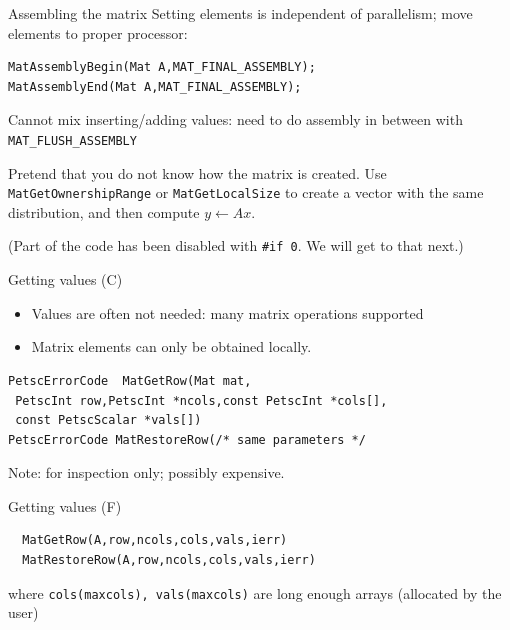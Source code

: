 \begin{longstory}
\begin{numberedframe}{Assembling the matrix}
Setting elements is independent of parallelism; move elements to
proper processor:
\begin{lstlisting}
MatAssemblyBegin(Mat A,MAT_FINAL_ASSEMBLY);
MatAssemblyEnd(Mat A,MAT_FINAL_ASSEMBLY);
\end{lstlisting}

Cannot mix inserting/adding values: need to do assembly in between
with \lstinline{MAT_FLUSH_ASSEMBLY}
\end{numberedframe}

\begin{exerciseframe}[matvec]
  Pretend that you do not know how the matrix is created. Use
  \lstinline{MatGetOwnershipRange} or \lstinline{MatGetLocalSize} to create a vector
  with the same distribution, and then compute $y\leftarrow Ax$.

  (Part of the code has been disabled with \verb+#if 0+. We will get
  to that next.)
\end{exerciseframe}

\begin{details}
\begin{numberedframe}{Getting values (C)}
  \begin{itemize}
  \item Values are often not needed: many matrix operations supported
  \item Matrix elements can only be obtained locally.
  \end{itemize}
\begin{lstlisting}
PetscErrorCode  MatGetRow(Mat mat,
 PetscInt row,PetscInt *ncols,const PetscInt *cols[],
 const PetscScalar *vals[])
PetscErrorCode MatRestoreRow(/* same parameters */
\end{lstlisting}
Note: for inspection only; possibly expensive.
\end{numberedframe}

\begin{fortran}
\begin{numberedframe}{Getting values (F)}
\begin{lstlisting}
  MatGetRow(A,row,ncols,cols,vals,ierr)
  MatRestoreRow(A,row,ncols,cols,vals,ierr)
\end{lstlisting}
where \lstinline{cols(maxcols), vals(maxcols)} are long enough arrays
(allocated by the user)
\end{numberedframe}
\end{fortran}


\end{details}
\end{longstory}
